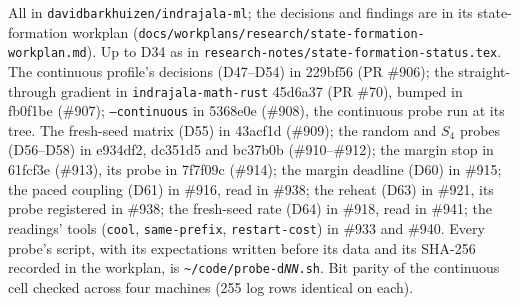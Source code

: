 \documentclass[11pt]{article}
\begin{document}
All in \texttt{davidbarkhuizen/indrajala-ml}; the decisions and findings are in its
state-formation workplan (\texttt{docs/workplans/research/state-formation-workplan.md}). Up to D34 as in \texttt{research-notes/state-formation-status.tex}. The
continuous profile's decisions (D47--D54) in 229bf56 (PR \#906); the straight-through gradient in
\texttt{indrajala-math-rust} 45d6a37 (PR \#70), bumped in fb0f1be (\#907); \texttt{--continuous} in
5368e0e (\#908), the continuous probe run at its tree. The fresh-seed matrix (D55) in 43acf1d (\#909);
the random and $S_4$ probes (D56--D58) in e934df2, dc351d5 and bc37b0b (\#910--\#912); the margin
stop in 61fcf3e (\#913), its probe in 7f7f09c (\#914); the margin deadline (D60) in \#915; the paced
coupling (D61) in \#916, read in \#938; the reheat (D63) in \#921, its probe registered in \#938; the
fresh-seed rate (D64) in \#918, read in \#941; the readings' tools (\texttt{cool},
\texttt{same-prefix}, \texttt{restart-cost}) in \#933 and \#940. Every probe's script, with its expectations
written before its data and its SHA-256 recorded in the workplan, is \texttt{\textasciitilde/code/probe-d\textit{NN}.sh}.
Bit parity of the continuous cell checked across four machines (255 log rows identical on each).



\end{document}
